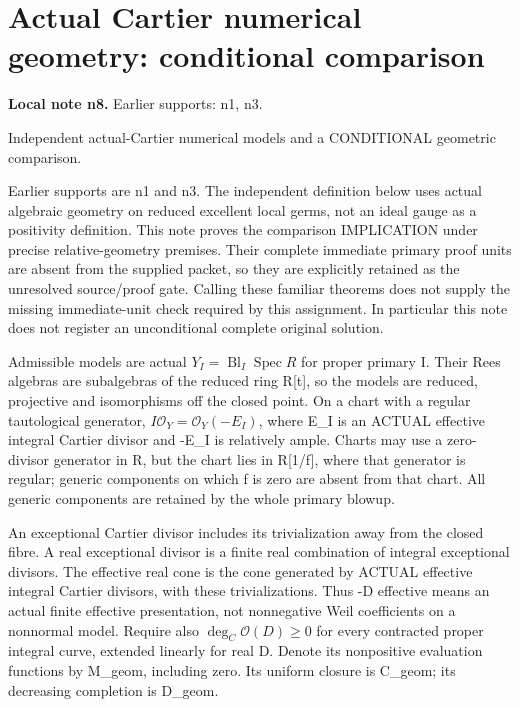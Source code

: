 \documentclass[11pt]{article}
\begin{document}
\section{Actual Cartier numerical geometry: conditional comparison}
\label{sec:n8}
\noindent\textbf{Local note n8.} Earlier supports: n1, n3.

Independent actual-Cartier numerical models and a CONDITIONAL geometric comparison.

Earlier supports are n1 and n3. The independent definition below uses actual algebraic geometry on reduced excellent local germs, not an ideal gauge as a positivity definition. This note proves the comparison IMPLICATION under precise relative-geometry premises. Their complete immediate primary proof units are absent from the supplied packet, so they are explicitly retained as the unresolved source/proof gate. Calling these familiar theorems does not supply the missing immediate-unit check required by this assignment. In particular this note does not register an unconditional complete original solution.

Admissible models are actual \(Y_I=\operatorname{Bl}_I\operatorname{Spec}R\) for proper primary I. Their Rees algebras are subalgebras of the reduced ring R[t], so the models are reduced, projective and isomorphisms off the closed point. On a chart with a regular tautological generator, \(I\mathcal O_Y=\mathcal O_Y(-E_I)\), where E\_I is an ACTUAL effective integral Cartier divisor and -E\_I is relatively ample. Charts may use a zero-divisor generator in R, but the chart lies in R[1/f], where that generator is regular; generic components on which f is zero are absent from that chart. All generic components are retained by the whole primary blowup.

An exceptional Cartier divisor includes its trivialization away from the closed fibre. A real exceptional divisor is a finite real combination of integral exceptional divisors. The effective real cone is the cone generated by ACTUAL effective integral Cartier divisors, with these trivializations. Thus -D effective means an actual finite effective presentation, not nonnegative Weil coefficients on a nonnormal model. Require also \(\deg_C\mathcal O(D)\ge0\) for every contracted proper integral curve, extended linearly for real D. Denote its nonpositive evaluation functions by M\_geom, including zero. Its uniform closure is C\_geom; its decreasing completion is D\_geom.
\end{document}
